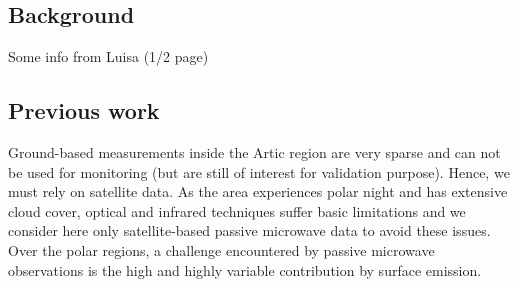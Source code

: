 \documentclass[12pt,oneside,a4paper]{article}
\begin{document}


\subsection{Background}
%
\label{sec:background}
Some info from Luisa (1/2 page)

\subsection{Previous work}
%
\label{sec:previousworks}
%
Ground-based measurements inside the Artic region are very sparse and can not
be used for monitoring (but are still of interest for validation purpose).
Hence, we must rely on satellite data. As the area experiences polar night and
has extensive cloud cover, optical and infrared techniques suffer basic
limitations and we consider here only satellite-based passive microwave data to
avoid these issues. Over the polar regions, a challenge encountered by
passive microwave observations is the high and highly variable contribution by
surface emission.
\end{document}
